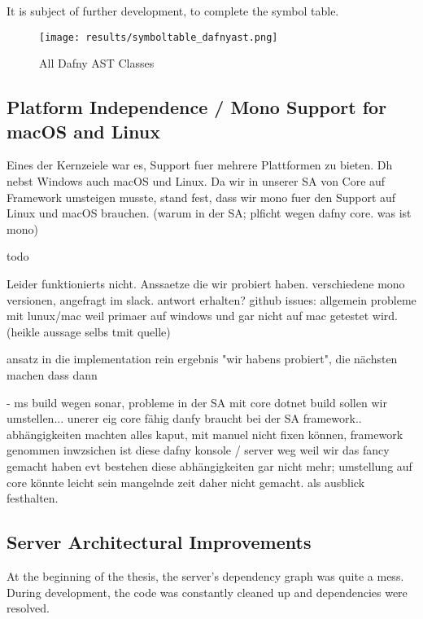 
It is subject of further development, to complete the symbol table.
\begin{figure}[h]
    \centering
    \texttt{[image: results/symboltable\_dafnyast.png]}
    \caption{All Dafny AST Classes}
    \label{fig:dafnyASTOverview}
\end{figure}



\subsection{Platform Independence / Mono Support for macOS and Linux}
Eines der Kernzeiele war es, Support fuer mehrere Plattformen zu bieten. Dh nebst Windows auch macOS und Linux.
Da wir in unserer SA von Core auf Framework umsteigen musste, stand fest, dass wir mono fuer den Support auf Linux und macOS brauchen.
(warum in der SA; plficht wegen dafny core. was ist mono)

todo

Leider funktionierts nicht.
Anssaetze die wir probiert haben. verschiedene mono versionen, angefragt im slack. antwort erhalten?
github issues: allgemein probleme mit lunux/mac weil primaer auf windows und gar nicht auf mac getestet wird. (heikle aussage selbs tmit quelle)

ansatz in die implementation rein
ergebnis "wir habens probiert", die nächsten machen dass dann

- ms build wegen sonar, probleme in der SA mit core
dotnet build sollen wir umstellen...
unerer eig core fähig
danfy braucht bei der SA framework.. abhängigkeiten machten alles kaput, mit manuel nicht fixen können, framework genommen
inwzsichen ist diese dafny konsole / server weg weil wir das fancy gemacht haben
evt bestehen diese abhängigkeiten gar nicht mehr; umstellung auf core könnte leicht sein
mangelnde zeit daher nicht gemacht. als ausblick festhalten.

\cite{sa}
\cite{mono-slack}
\cite{mono-git}


\subsection{Server Architectural Improvements}
At the beginning of the thesis, the server's dependency graph was quite a mess.
During development, the code was constantly cleaned up and dependencies were resolved.

